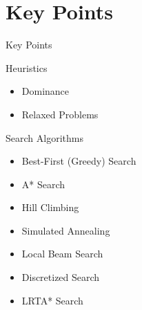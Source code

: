 \documentclass[12pt]{beamer}
\begin{document}
\part{Key Points}
\begin{frame}{Key Points}
	\begin{block}{Heuristics}
		\begin{itemize}
			\item Dominance
			\item Relaxed Problems
		\end{itemize}
	\end{block}
	\begin{block}{Search Algorithms}
		\begin{itemize}
			\item Best-First (Greedy) Search
			\item A* Search
			\item Hill Climbing
			\item Simulated Annealing
			\item Local Beam Search
			\item Discretized Search
			\item LRTA* Search
		\end{itemize}
	\end{block}
\end{frame}
\end{document}

